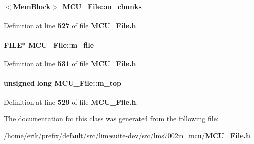 \paragraph[{m\+\_\+chunks}]{$<${\bf Mem\+Block}$>$ M\+C\+U\+\_\+\+File\+::m\+\_\+chunks}\label{classMCU__File_a3c75325b87d1b0f6fd7ec1f39761a3c3}


Definition at line {\bf 527} of file {\bf M\+C\+U\+\_\+\+File.\+h}.

\paragraph[{m\+\_\+file}]{\setlength{\rightskip}{0pt plus 5cm}F\+I\+LE$\ast$ M\+C\+U\+\_\+\+File\+::m\+\_\+file\hspace{0.3cm}{\ttfamily [private]}}\label{classMCU__File_a1aeab03ddabe6f069a8dea56f21b1785}


Definition at line {\bf 531} of file {\bf M\+C\+U\+\_\+\+File.\+h}.

\paragraph[{m\+\_\+top}]{\setlength{\rightskip}{0pt plus 5cm}unsigned long M\+C\+U\+\_\+\+File\+::m\+\_\+top}\label{classMCU__File_ae9467e35ed3c6a9aef28b7d728d0f54d}


Definition at line {\bf 529} of file {\bf M\+C\+U\+\_\+\+File.\+h}.



The documentation for this class was generated from the following file\+:\begin{DoxyCompactItemize}
\item 
/home/erik/prefix/default/src/limesuite-\/dev/src/lms7002m\+\_\+mcu/{\bf M\+C\+U\+\_\+\+File.\+h}\end{DoxyCompactItemize}

